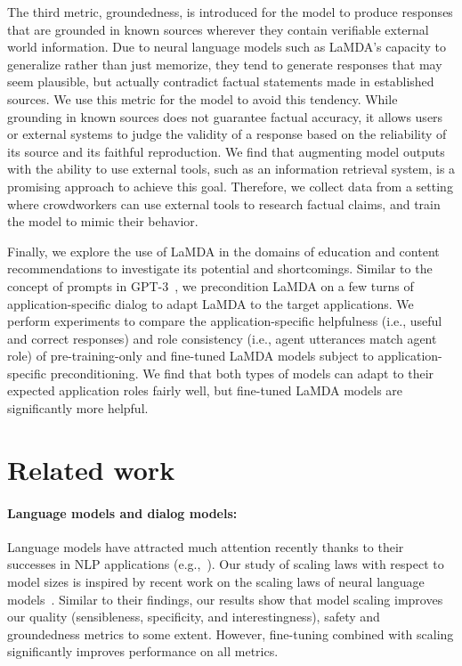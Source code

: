The third metric, groundedness, is introduced for the model to produce responses that are grounded in known sources wherever they contain verifiable external world information. Due to neural language models such as LaMDA's capacity to generalize rather than just memorize, they tend to generate responses that may seem plausible, but actually contradict factual statements made in established sources. We use this metric for the model to avoid this tendency. While grounding in known sources does not guarantee factual accuracy, it allows users or external systems to judge the validity of a response based on the reliability of its source and its faithful reproduction. We find that augmenting model outputs with the ability to use external tools, such as an information retrieval system, is a promising approach to achieve this goal. Therefore, we collect data from a setting where crowdworkers can use external tools to research factual claims, and train the model to mimic their behavior.

Finally, we explore the use of LaMDA in the domains of education and content recommendations to investigate its potential and shortcomings. Similar to the concept of prompts in GPT-3~\cite{gpt320}, we precondition LaMDA on a few turns of application-specific dialog to adapt LaMDA to the target applications. We perform experiments to compare the application-specific helpfulness (i.e., useful and correct responses) and role consistency (i.e., agent utterances match agent role) of pre-training-only and fine-tuned LaMDA models subject to application-specific preconditioning. We find that both types of models can adapt to their expected application roles fairly well, but fine-tuned LaMDA models are significantly more helpful.

\section{Related work}
\label{sec:related-work}

\paragraph{Language models and dialog models:} Language models have attracted much attention recently thanks to their successes in NLP applications (e.g.,~\cite{mikolov2010recurrent,sutskever2011generating,JozefowiczVSSW16,dai2015semi,kiros2015skip,howard-ruder-2018-universal,radford2015unsupervised,radford2018improving,gpt320,rae2021scaling}). Our study of scaling laws with respect to model sizes is inspired by recent work on the scaling laws of neural language models~\cite{gpt320,Kaplan2020ScalingLF}. Similar to their findings, our results show that model scaling improves our quality (sensibleness, specificity, and interestingness), safety and groundedness metrics to some extent. However, fine-tuning combined with scaling significantly improves performance on all metrics. 

